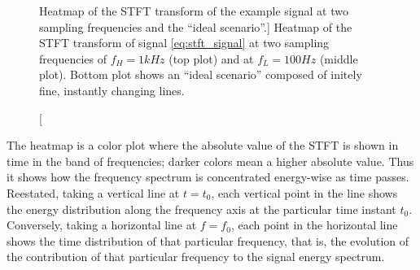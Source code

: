 \begin{figure}[htb!]
\centering
\scalebox{0.975}{
	
}
	\caption
[Heatmap of the STFT transform of the example signal at two sampling frequencies and the ``ideal scenario''.]
{Heatmap of the STFT transform of signal \eqref{eq:stft_signal} at two sampling frequencies of $f_H = 1kHz$ (top plot) and at $f_L = 100Hz$ (middle plot). Bottom plot shows an ``ideal scenario'' composed of initely fine, instantly changing lines.}
	\label{fig:stft_heatmap}
\end{figure} %

	The heatmap is a color plot where the absolute value of the STFT is shown in time in the band of frequencies; darker colors mean a higher absolute value. Thus it shows how the frequency spectrum is concentrated energy-wise as time passes. Reestated, taking a vertical line at $t = t_0$, each vertical point in the line shows the energy distribution along the frequency axis at the particular time instant $t_0$. Conversely, taking a horizontal line at $f = f_0$, each point in the horizontal line shows the time distribution of that particular frequency, that is, the evolution of the contribution of that particular frequency to the signal energy spectrum.

